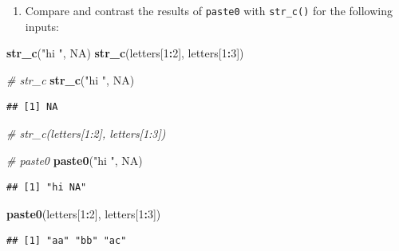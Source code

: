 \documentclass[
]{article}
\newenvironment{Shaded}{\begin{snugshade}}{\end{snugshade}}
\newcommand{\CommentTok}[1]{\textcolor[rgb]{0.56,0.35,0.01}{\textit{#1}}}
\newcommand{\ConstantTok}[1]{\textcolor[rgb]{0.56,0.35,0.01}{#1}}
\newcommand{\DecValTok}[1]{\textcolor[rgb]{0.00,0.00,0.81}{#1}}
\newcommand{\FunctionTok}[1]{\textcolor[rgb]{0.13,0.29,0.53}{\textbf{#1}}}
\newcommand{\NormalTok}[1]{#1}
\newcommand{\SpecialCharTok}[1]{\textcolor[rgb]{0.81,0.36,0.00}{\textbf{#1}}}
\newcommand{\StringTok}[1]{\textcolor[rgb]{0.31,0.60,0.02}{#1}}
\providecommand{\tightlist}{%
  \setlength{\itemsep}{0pt}\setlength{\parskip}{0pt}}
\begin{document}
\begin{enumerate}
\def\labelenumi{\arabic{enumi}.}
\tightlist
\item
  Compare and contrast the results of \texttt{paste0} with
  \texttt{str\_c()} for the following inputs:
\end{enumerate}

\begin{Shaded}
\begin{Highlighting}[]
\FunctionTok{str\_c}\NormalTok{(}\StringTok{"hi "}\NormalTok{, }\ConstantTok{NA}\NormalTok{)}
\FunctionTok{str\_c}\NormalTok{(letters[}\DecValTok{1}\SpecialCharTok{:}\DecValTok{2}\NormalTok{], letters[}\DecValTok{1}\SpecialCharTok{:}\DecValTok{3}\NormalTok{])}
\end{Highlighting}
\end{Shaded}

\begin{Shaded}
\begin{Highlighting}[]
\CommentTok{\# str\_c}
\FunctionTok{str\_c}\NormalTok{(}\StringTok{"hi "}\NormalTok{, }\ConstantTok{NA}\NormalTok{)}
\end{Highlighting}
\end{Shaded}

\begin{verbatim}
## [1] NA
\end{verbatim}

\begin{Shaded}
\begin{Highlighting}[]
\CommentTok{\# str\_c(letters[1:2], letters[1:3])}

\CommentTok{\# paste0}
\FunctionTok{paste0}\NormalTok{(}\StringTok{"hi "}\NormalTok{, }\ConstantTok{NA}\NormalTok{)}
\end{Highlighting}
\end{Shaded}

\begin{verbatim}
## [1] "hi NA"
\end{verbatim}

\begin{Shaded}
\begin{Highlighting}[]
\FunctionTok{paste0}\NormalTok{(letters[}\DecValTok{1}\SpecialCharTok{:}\DecValTok{2}\NormalTok{], letters[}\DecValTok{1}\SpecialCharTok{:}\DecValTok{3}\NormalTok{])}
\end{Highlighting}
\end{Shaded}

\begin{verbatim}
## [1] "aa" "bb" "ac"
\end{verbatim}
\end{document}
